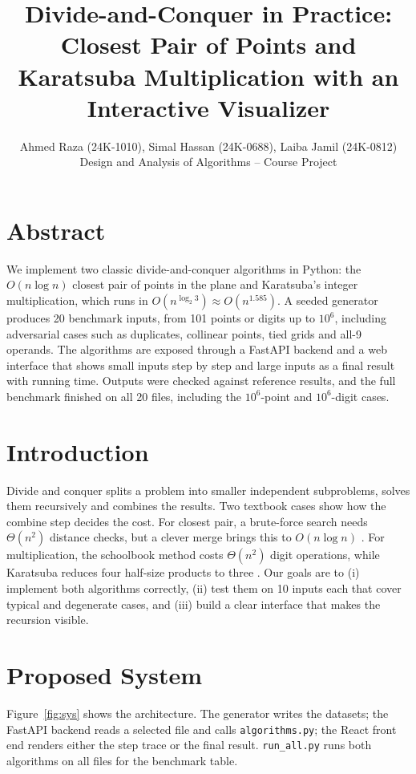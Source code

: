 \documentclass[10pt,a4paper]{article}
\title{\textbf{\Large Divide-and-Conquer in Practice: Closest Pair of Points and Karatsuba Multiplication with an Interactive Visualizer}}
\author{Ahmed Raza (24K-1010), Simal Hassan (24K-0688), Laiba Jamil (24K-0812)\\ Design and Analysis of Algorithms -- Course Project}
\date{}
\begin{document}
\maketitle

\section*{Abstract}
We implement two classic divide-and-conquer algorithms in Python: the $O(n\log n)$ closest pair of points in the plane and Karatsuba's integer multiplication, which runs in $O(n^{\log_2 3})\approx O(n^{1.585})$. A seeded generator produces 20 benchmark inputs, from 101 points or digits up to $10^6$, including adversarial cases such as duplicates, collinear points, tied grids and all-9 operands. The algorithms are exposed through a FastAPI backend and a web interface that shows small inputs step by step and large inputs as a final result with running time. Outputs were checked against reference results, and the full benchmark finished on all 20 files, including the $10^6$-point and $10^6$-digit cases.

\section{Introduction}
Divide and conquer splits a problem into smaller independent subproblems, solves them recursively and combines the results. Two textbook cases show how the combine step decides the cost. For closest pair, a brute-force search needs $\Theta(n^2)$ distance checks, but a clever merge brings this to $O(n\log n)$ \cite{shamos1975,kleinberg2006}. For multiplication, the schoolbook method costs $\Theta(n^2)$ digit operations, while Karatsuba reduces four half-size products to three \cite{karatsuba1962}. Our goals are to (i) implement both algorithms correctly, (ii) test them on 10 inputs each that cover typical and degenerate cases, and (iii) build a clear interface that makes the recursion visible.

\section{Proposed System}
Figure~\ref{fig:sys} shows the architecture. The generator writes the datasets; the FastAPI backend \cite{fastapi} reads a selected file and calls \texttt{algorithms.py}; the React front end renders either the step trace or the final result. \texttt{run\_all.py} runs both algorithms on all files for the benchmark table.
\end{document}
